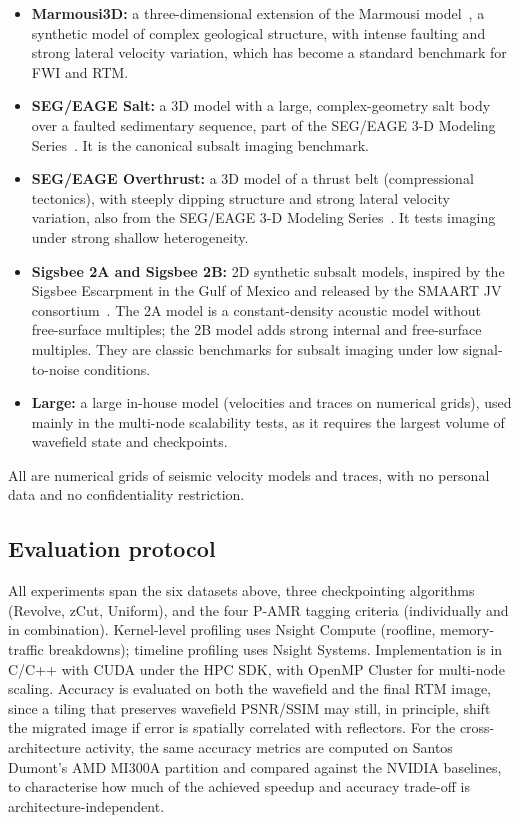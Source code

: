 \documentclass[12pt,a4paper]{article}
\newcommand{\pamr}{P\nobreakdash-AMR}
\begin{document}
\begin{itemize}
  \item \textbf{Marmousi3D:} a three-dimensional extension of the Marmousi
        model~\cite{versteeg1994marmousi}, a synthetic model of complex
        geological structure, with intense faulting and strong lateral
        velocity variation, which has become a standard benchmark for FWI
        and RTM.
  \item \textbf{SEG/EAGE Salt:} a 3D model with a large, complex-geometry
        salt body over a faulted sedimentary sequence, part of the
        SEG/EAGE 3-D Modeling Series~\cite{aminzadeh1997segeage}. It is
        the canonical subsalt imaging benchmark.
  \item \textbf{SEG/EAGE Overthrust:} a 3D model of a thrust belt
        (compressional tectonics), with steeply dipping structure and
        strong lateral velocity variation, also from the SEG/EAGE 3-D
        Modeling Series~\cite{aminzadeh1997segeage}. It tests imaging
        under strong shallow heterogeneity.
  \item \textbf{Sigsbee 2A and Sigsbee 2B:} 2D synthetic subsalt models,
        inspired by the Sigsbee Escarpment in the Gulf of Mexico and
        released by the SMAART JV consortium~\cite{paffenholz2002sigsbee}.
        The 2A model is a constant-density acoustic model without
        free-surface multiples; the 2B model adds strong internal and
        free-surface multiples. They are classic benchmarks for subsalt
        imaging under low signal-to-noise conditions.
  \item \textbf{Large:} a large in-house model (velocities and traces on
        numerical grids), used mainly in the multi-node scalability tests,
        as it requires the largest volume of wavefield state and
        checkpoints.
\end{itemize}

All are numerical grids of seismic velocity models and traces, with no
personal data and no confidentiality restriction.

\subsection{Evaluation protocol}

All experiments span the six datasets above, three checkpointing
algorithms (Revolve, zCut, Uniform), and the four \pamr{} tagging criteria
(individually and in combination). Kernel-level profiling uses Nsight
Compute (roofline, memory-traffic breakdowns); timeline profiling uses
Nsight Systems. Implementation is in C/C++ with CUDA under the HPC SDK, with OpenMP
Cluster for multi-node scaling. Accuracy is evaluated on both the wavefield and
the final RTM image, since a tiling that preserves wavefield PSNR/SSIM may still,
in principle, shift the migrated image if error is spatially correlated with
reflectors. For the cross-architecture activity, the same accuracy metrics are
computed on Santos Dumont's AMD MI300A partition and compared against the NVIDIA
baselines, to characterise how much of the achieved speedup and accuracy
trade-off is architecture-independent.
\end{document}
